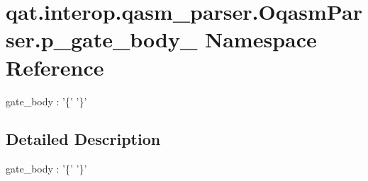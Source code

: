 \hypertarget{namespaceqat_1_1interop_1_1qasm__parser_1_1OqasmParser_1_1p__gate__body__0}{\section{qat.\-interop.\-qasm\-\_\-parser.\-Oqasm\-Parser.\-p\-\_\-gate\-\_\-body\-\_ Namespace Reference}
\label{namespaceqat_1_1interop_1_1qasm__parser_1_1OqasmParser_1_1p__gate__body__0}
}


gate\-\_\-body \-: '\{' '\}'  




\subsection{Detailed Description}
gate\-\_\-body \-: '\{' '\}' 